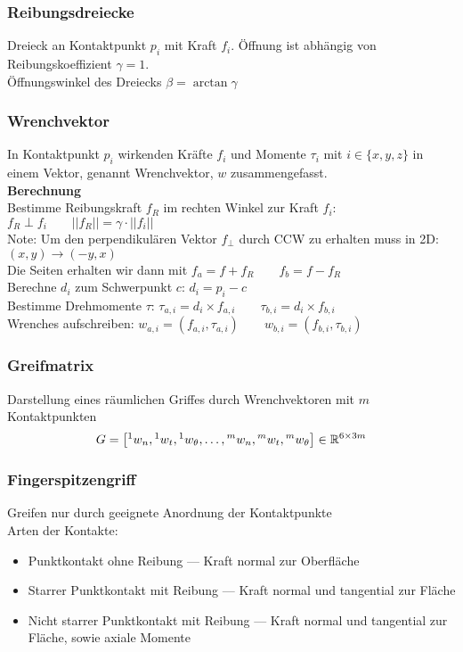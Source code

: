 \subsubsection{Reibungsdreiecke}
Dreieck an Kontaktpunkt \(p_i\) mit Kraft \(f_i\). Öffnung ist abhängig von Reibungskoeffizient \(\gamma = 1\).\\
Öffnungswinkel des Dreiecks \(\beta = \arctan \gamma\)

\subsubsection{Wrenchvektor}
In Kontaktpunkt \(p_i\) wirkenden Kräfte \(f_i\) und Momente \(\tau_i\) mit \(i \in \{x, y, z\}\) in einem Vektor,
genannt Wrenchvektor, \(w\) zusammengefasst.\\

\textbf{Berechnung}\\
Bestimme Reibungskraft \(f_R\) im rechten Winkel zur Kraft \(f_i\): \(f_R \perp f_i \qquad ||f_R|| = \gamma \cdot ||f_i||\)\\
Note: Um den perpendikulären Vektor \(f_{\perp}\) durch CCW zu erhalten muss in 2D: \((x, y) \rightarrow (-y, x)\)\\
Die Seiten erhalten wir dann mit \(f_a = f + f_R \qquad f_b = f - f_R\)\\
Berechne \(d_i\) zum Schwerpunkt \(c\): \(d_i = p_i - c\)\\
Bestimme Drehmomente \(\tau\): \(\tau_{a,i} = d_i \times f_{a,i} \qquad \tau_{b,i} = d_i \times f_{b,i}\)\\
Wrenches aufschreiben: \(w_{a,i} = (f_{a,i}, \tau_{a,i}) \qquad w_{b,i} = (f_{b,i}, \tau_{b, i})\)\\
\subsubsection{Greifmatrix}
Darstellung eines räumlichen Griffes durch Wrenchvektoren mit \(m\) Kontaktpunkten
\[G = \left[ {}^1w_n, {}^1w_t, {}^1w_{\theta}, \ldots, {}^mw_n, {}^mw_t, {}^mw_{\theta}\right] \in \mathbb{R}^{6\times3m}\]

\subsubsection{Fingerspitzengriff}
Greifen nur durch geeignete Anordnung der Kontaktpunkte\\
Arten der Kontakte:
\begin{itemize}
\item Punktkontakt ohne Reibung --- Kraft normal zur Oberfläche
\item Starrer Punktkontakt mit Reibung --- Kraft normal und tangential zur Fläche
\item Nicht starrer Punktkontakt mit Reibung --- Kraft normal und tangential zur Fläche, sowie axiale Momente
\end{itemize}


